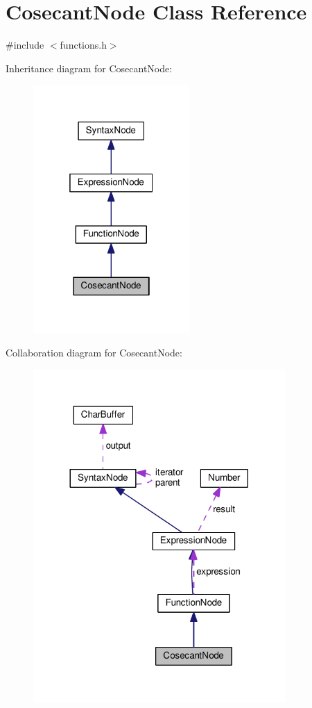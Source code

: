 \hypertarget{classCosecantNode}{}\section{Cosecant\+Node Class Reference}
\label{classCosecantNode}


{\ttfamily \#include $<$functions.\+h$>$}



Inheritance diagram for Cosecant\+Node\+:\nopagebreak
\begin{figure}[H]
\begin{center}
\leavevmode
\includegraphics[width=169pt]{classCosecantNode__inherit__graph}
\end{center}
\end{figure}


Collaboration diagram for Cosecant\+Node\+:\nopagebreak
\begin{figure}[H]
\begin{center}
\leavevmode
\includegraphics[width=272pt]{classCosecantNode__coll__graph}
\end{center}
\end{figure}
